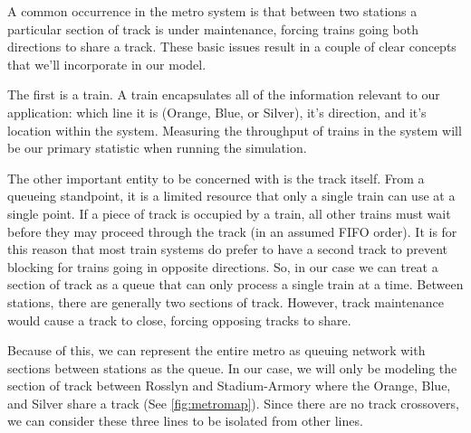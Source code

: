 \documentclass[a4paper,12pt]{article}
\begin{document}
A common occurrence in the metro system is that between two stations a particular section of track is under
maintenance, forcing trains going both directions to share a track. These basic issues result in a couple of clear
concepts that we'll incorporate in our model.

The first is a train. A train encapsulates all of the information relevant to our application: which line it is
(Orange, Blue, or Silver), it's direction, and it's location within the system. Measuring the throughput of trains
in the system will be our primary statistic when running the simulation.

The other important entity to be concerned with is the track itself. From a queueing standpoint, it is a limited
resource that only a single train can use at a single point. If a piece of track is occupied by a train, all other
trains must wait before they may proceed through the track (in an assumed FIFO order). It is for this reason that
most train systems do prefer to have a second track to prevent blocking for trains going in opposite directions.
So, in our case we can treat a section of track as a queue that can only process a single train at a time. Between
stations, there are generally two sections of track. However, track maintenance would cause a track to close, forcing
opposing tracks to share.

Because of this, we can represent the entire metro as queuing network with sections between stations as the queue. In
our case, we will only be modeling the section of track between Rosslyn and Stadium-Armory where the Orange, Blue, and
Silver share a track (See \ref{fig:metromap}). Since there are no track crossovers, we can consider these three lines
to be isolated from other lines.
\end{document}
